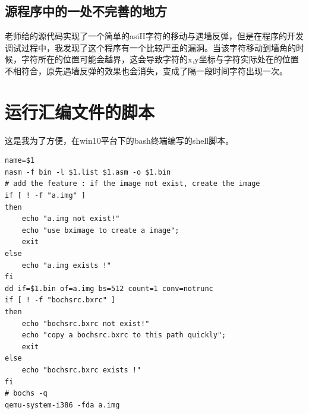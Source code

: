 \documentclass[forprint]{WHUBachelor}
\begin{document}
\section{源程序中的一处不完善的地方}

老师给的源代码实现了一个简单的asiII字符的移动与遇墙反弹，但是在程序的开发调试过程中，我发现了这个程序有一个比较严重的漏洞。当该字符移动到墙角的时候，字符所在的位置可能会越界，这会导致字符的x,y坐标与字符实际处在的位置不相符合，原先遇墙反弹的效果也会消失，变成了隔一段时间字符出现一次。












% 










\appendix

\chapter{运行汇编文件的脚本}

这是我为了方便，在win10平台下的bash终端编写的shell脚本。
\begin{lstlisting}
name=$1
nasm -f bin -l $1.list $1.asm -o $1.bin
# add the feature : if the image not exist, create the image
if [ ! -f "a.img" ]
then
    echo "a.img not exist!"
    echo "use bximage to create a image";
    exit
else
    echo "a.img exists !"
fi
dd if=$1.bin of=a.img bs=512 count=1 conv=notrunc
if [ ! -f "bochsrc.bxrc" ]
then
    echo "bochsrc.bxrc not exist!"
    echo "copy a bochsrc.bxrc to this path quickly";
    exit
else
    echo "bochsrc.bxrc exists !"
fi
# bochs -q
qemu-system-i386 -fda a.img
\end{lstlisting}

\cleardoublepage
\end{document}
